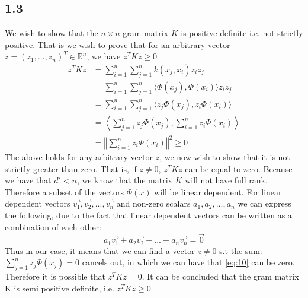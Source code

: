 \documentclass{article}
\begin{document}
\subsection{1.3}
We wish to show that the $n \times n$ gram matrix $K$ is positive definite i.e. not strictly positive. That is we wish to prove that for an arbitrary vector $z = (z_1,\dots,z_n)^T \in \mathbb{R}^n$, we have $z^T K z \geq 0$
\begin{align}
z^T K z &= \sum\limits_{i=1}^n \sum\limits_{j=1}^n k(x_j,x_i) z_iz_j \\
&= \sum\limits_{i=1}^n \sum\limits_{j=1}^n \langle \Phi(x_j), \Phi(x_i) \rangle z_iz_j \\
&= \sum\limits_{i=1}^n \sum\limits_{j=1}^n \langle z_j \Phi(x_j), z_i \Phi(x_i) \rangle \\
&= \left\langle  \sum\limits_{j=1}^n z_j \Phi(x_j), \sum\limits_{i=1}^n  z_i \Phi (x_i)  \right\rangle \\
\label{eq:10}
&= \left\Vert \sum\limits_{i=1}^n z_i \Phi(x_i) \right\Vert^2 \geq
0
\end{align}
The above holds for any arbitrary vector $z$, we now wish to show that it is not strictly greater than zero. That is, if $z \neq 0$, $z^TKz$ can be equal to zero. Because we have that $d'<n$, we know that the matrix $K$ will not have full rank. Therefore a subset of the vectors $\Phi(x)$ will be linear dependent. For linear dependent vectors $\vec{v_1},\vec{v_2},...,\vec{v_n}$ and non-zero scalars $a_1,a_2,...,a_n$ we can express the following, due to the fact that linear dependent vectors can be written as a combination of each other:
\begin{equation}
a_1 \vec{v_1} + a_2 \vec{v_2} + ... + a_n \vec{v_n} = \vec{0}
\end{equation}
Thus in our case, it means that we can find a vector $z \neq 0$ s.t the sum: $\sum_{j=1}^n z_j \Phi(x_j)=0$ cancels out, in which we can have that \eqref{eq:10} can be zero. Therefore it is possible that $z^T K z = 0$. It can be concluded that the gram matrix K is semi positive definite, i.e. $z^T K z \geq 0$
\end{document}
